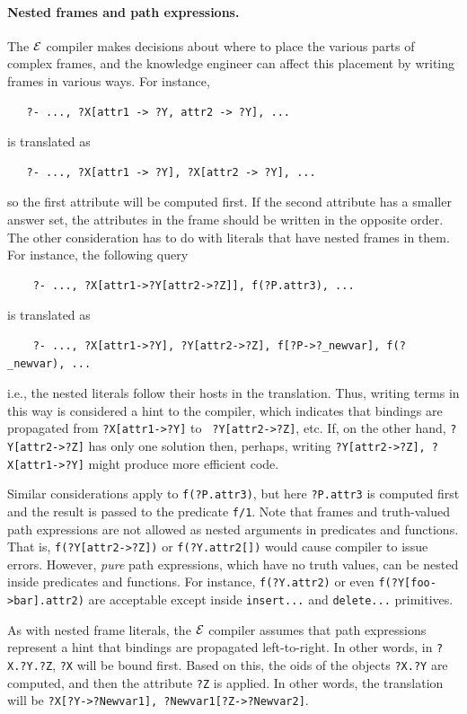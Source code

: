 \documentclass[11pt]{article}
\newcommand{\ERGO}{\mbox{\ensuremath{\cal{E}}\smaller{{\sc{RGO}}}}\xspace}
\newcommand{\FLSYSTEM}{\ERGO}
\begin{document}
\paragraph{Nested frames and path expressions.}
The \FLSYSTEM compiler makes decisions about
where to place the various parts of complex frames, and the
knowledge engineer can affect this placement by writing frames in various ways.
For instance,
\begin{verbatim}
   ?- ..., ?X[attr1 -> ?Y, attr2 -> ?Y], ...
\end{verbatim}
is translated as
\begin{verbatim}
   ?- ..., ?X[attr1 -> ?Y], ?X[attr2 -> ?Y], ...  
\end{verbatim}
so the first attribute will be computed first. If the second attribute has
a smaller answer set, the attributes in the frame should be written in
the opposite order. The other consideration has to do with literals that
have nested frames in them. For instance, the following query
\begin{verbatim}
    ?- ..., ?X[attr1->?Y[attr2->?Z]], f(?P.attr3), ...
\end{verbatim}
is translated as
\begin{verbatim}
    ?- ..., ?X[attr1->?Y], ?Y[attr2->?Z], f[?P->?_newvar], f(?_newvar), ...
\end{verbatim}
i.e., the nested literals follow their hosts in the translation.
Thus, writing terms in this way is considered a hint to the compiler, which
indicates that bindings are propagated from {\tt ?X[attr1->?Y]} to {\tt
  ?Y[attr2->?Z]}, etc. If, on the other hand, {\tt ?Y[attr2->?Z]} has only one
solution then, perhaps, writing {\tt ?Y[attr2->?Z], ?X[attr1->?Y]} might
produce more efficient code.

Similar considerations apply to {\tt f(?P.attr3)}, but here
\texttt{?P.attr3} is computed first and the result is passed to the
predicate \texttt{f/1}.   
Note that frames and
truth-valued path expressions are not allowed as nested arguments
in predicates and functions. That is, \texttt{f(?Y[attr2->?Z])} or
\texttt{f(?Y.attr2[])} would cause compiler to issue errors. However,
\emph{pure} path expressions, which have no truth values, can be nested
inside predicates and functions. For instance, \texttt{f(?Y.attr2)} or 
even \texttt{f(?Y[foo->bar].attr2)} are acceptable except inside
\texttt{insert{...}}  and \texttt{delete{...}} primitives. 

As with nested frame literals, the \FLSYSTEM compiler assumes that path
expressions represent a hint that bindings are propagated left-to-right.
In other words, in {\tt ?X.?Y.?Z}, {\tt ?X} will be bound first.
Based on this, the oids of the objects {\tt ?X.?Y} are computed, and
then the attribute {\tt ?Z} is applied. In other words, the translation will
be {\tt ?X[?Y->?Newvar1], ?Newvar1[?Z->?Newvar2]}.
\end{document}

